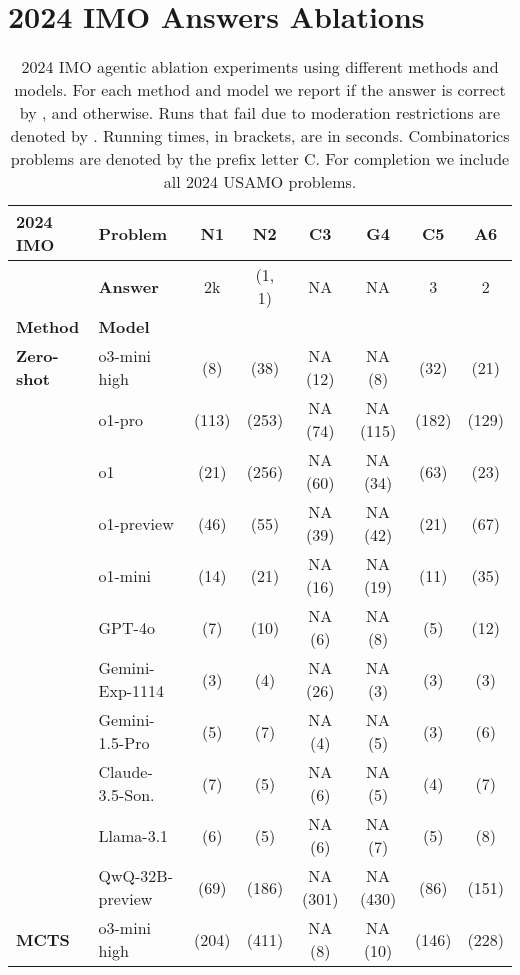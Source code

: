 \section{2024 IMO Answers Ablations}
\label{appendix:C}
\begin{table}[H]
\caption{2024 IMO agentic ablation experiments using different methods and models. For each method and model we report if the answer is correct by \C, and \X otherwise. Runs that fail due to moderation restrictions are denoted by \F. Running times, in brackets, are in seconds. Combinatorics problems are denoted by the prefix letter C. For completion we include all 2024 USAMO problems.}
  \centering
  \scriptsize
\begin{tabular}{llcccccc}
\toprule
{\bf 2024 IMO} & {\bf Problem} & {\bf N1} & {\bf N2} & {\bf C3} & {\bf G4} & {\bf C5} & {\bf A6}\\   
\midrule
& \textbf{Answer} & 2k & (1, 1) & NA & NA & 3 & 2\\
\midrule
\textbf{Method} & \textbf{Model} & & & & & &\\
\midrule
\textbf{Zero-shot} 
& o3-mini high & \C (8) & \C (38) & NA (12) & NA (8) & \X (32) & \X (21)\\
& o1-pro & \C (113) & \C (253) & NA (74) & NA (115) & \X (182) & \X (129)\\
& o1 & \C (21) & \X (256) & NA (60) & NA (34) & \X (63) & \X (23)\\
& o1-preview & \X (46) & \C (55) & NA (39) & NA (42) & \X (21) & \X (67) \\
& o1-mini & \X (14) & \X (21) & NA (16) & NA (19) & \X (11) & \X (35) \\
& GPT-4o & \X (7) & \X (10) & NA (6) & NA (8) & \X (5) & \X (12) \\
& Gemini-Exp-1114 & \X (3) & \C (4) & NA (26) & NA (3) & \X (3) & \X (3)\\
& Gemini-1.5-Pro & \X (5) & \X (7) & NA (4) & NA (5) & \X (3) & \X (6) \\
& Claude-3.5-Son. & \X (7) & \X (5) & NA (6) & NA (5) & \X (4) & \X (7) \\
& Llama-3.1 & \X (6) & \X (5) & NA (6) & NA (7) & \X (5) & \X (8) \\
& QwQ-32B-preview & \C (69) & \C (186) & NA (301) & NA (430) & \X (86) & \X (151) \\
\midrule
\textbf{MCTS} 
& o3-mini high & \X (204) & \C (411) & NA (8) & NA (10) & \X (146) & \X (228) \\

\end{tabular}
\end{table}
